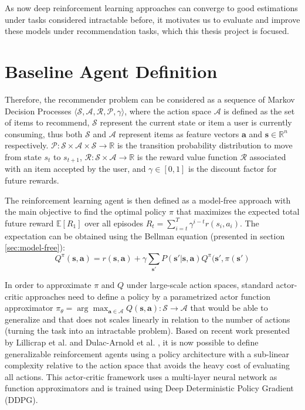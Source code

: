 As now deep reinforcement learning approaches can converge to good estimations under tasks considered intractable before, it motivates us to evaluate and improve these models under recommendation tasks, which this thesis project is focused.

\section{Baseline Agent Definition}
\label{sec:baseline}

Therefore, the recommender problem can be considered as a sequence of Markov Decision Processes $\langle \mathcal{S}, \mathcal{A}, \mathcal{R}, \mathcal{P}, \gamma \rangle$, where the action space $\mathcal{A}$ is defined as the set of items to recommend, $\mathcal{S}$ represent the current state or item a user is currently consuming, thus both $\mathcal{S}$ and $\mathcal{A}$ represent items as feature vectors $\mathbf{a}$ and $\mathbf{s} \in \mathbb{R}^n$ respectively. $\mathcal{P}: \mathcal{S} \times \mathcal{A} \times \mathcal{S} \rightarrow \mathbb{R}$ is the transition probability distribution to move from state ${s_t}$ to $s_{t+1}$,  $\mathcal{R}: \mathcal{S} \times \mathcal{A} \rightarrow \mathbb{R}$ is the reward value function $\mathcal{R}$ associated with an item accepted by the user, and $\gamma \in [0, 1]$ is the discount factor for future rewards. 

The reinforcement learning agent is then defined as a model-free approach with the main objective to find the optimal policy $\pi$ that maximizes the expected total future reward $\mathbb{E}[R_1]$ over all episodes $R_t = \sum^{T}_{i=t} \gamma^{i-t}r(s_i, a_i)$. The expectation can be obtained using the Bellman equation (presented in section \ref{sec:model-free}): 
\begin{equation}
Q^{\pi}(\mathbf{s}, \mathbf{a}) = r(\mathbf{s}, \mathbf{a}) + \gamma \sum_{\mathbf{s}'}P(\mathbf{s}'|\mathbf{s}, \mathbf{a}) Q^{\pi}(\mathbf{s}', \pi(\mathbf{s}')
\end{equation}

In order to approximate $\pi$ and $Q$ under large-scale action spaces, standard actor-critic approaches need to define a policy by a parametrized actor function approximator $\pi_{\theta} = \arg\max_{\mathbf{a \in \mathcal{A}}} Q(\mathbf{s}, \mathbf{a}) : \mathcal{S} \rightarrow \mathcal{A}$ that would be able to generalize and that does not scales linearly in relation to the number of actions (turning the task into an intractable problem). Based on recent work presented by Lillicrap et al. \cite{lillicrap2015continuous} and Dulac-Arnold et al. \cite{Dulac-Arnold2015}, it is now possible to define generalizable reinforcement agents using a policy architecture with a sub-linear complexity relative to the action space that avoids the heavy cost of evaluating all actions. This actor-critic framework uses a multi-layer neural network as function approximators and is trained using Deep Deterministic Policy Gradient (DDPG).

